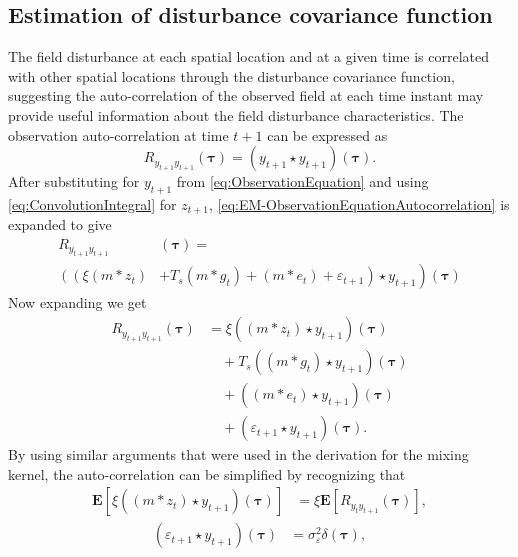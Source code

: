 \documentclass[10pt,twocolumn,twoside]{IEEEtran}
\begin{document}
\subsection{Estimation of disturbance covariance function}
The field disturbance at each spatial location and at a given time is correlated with other spatial locations through the disturbance covariance
function, suggesting the auto-correlation of the observed field at each time instant may provide useful information about the field disturbance characteristics.
The observation auto-correlation at time $t+1$ can be expressed as
\begin{equation}\label{eq:EM-ObservationEquationAutocorrelation}
	R_{y_{t+1}y_{t+1}}(\boldsymbol{\tau})=(y_{t+1} \star y_{t+1})(\boldsymbol\tau).
\end{equation}
 After substituting for $y_{t+1}$ from \eqref{eq:ObservationEquation} and using \eqref{eq:ConvolutionIntegral}   for $z_{t+1}$,  \eqref{eq:EM-ObservationEquationAutocorrelation} is expanded to give 
\begin{align}\label{eq:EM-expanded_auto_corr}  
	R_{y_{t+1}y_{t+1}} & (\boldsymbol{\tau}) = \\ \nonumber 
	\left( \left(\xi( m\ast z_{t}) \right.\right.&+\left.\left. T_s(m\ast g_{t}) + ( m \ast e_{t})+\varepsilon_{t+1} \right) \star y_{t+1} \right) (\boldsymbol{\tau})
\end{align}
Now expanding we get
\begin{align}\label{eq:expanded_auto_corr}
	R_{y_{t+1}y_{t+1}}(\boldsymbol{\tau}) &= \xi((m \ast z_{t}) \star y_{t+1})(\boldsymbol{\tau}) \nonumber \\
	&\quad+T_s((m\ast g_{t})\star y_{t+1})(\boldsymbol{\tau}) \nonumber \\
	&\quad+((m\ast e_{t})\star  y_{t+1})(\boldsymbol{\tau}) \nonumber \\
	&\quad+(\varepsilon_{t+1} \star y_{t+1})(\boldsymbol{\tau}).
\end{align}
By using similar arguments that were used in the derivation for the mixing kernel, the auto-correlation can be simplified by recognizing that
\begin{align}\label{eq:EM-Autoterm1} 
  \mathbf{E}[\xi((m\ast z_{t})\star y_{t+1})(\boldsymbol{\tau})]&=\xi \mathbf{E}[ R_{y_ty_{t+1}}(\boldsymbol{\tau})],
\end{align}
\begin{align}\label{eq:EM-Autoterm2}
 (\varepsilon_{t+1}\star y_{t+1})(\boldsymbol\tau)&=\sigma_{\varepsilon}^2\delta(\boldsymbol{\tau}),
\end{align} 
\end{document}
